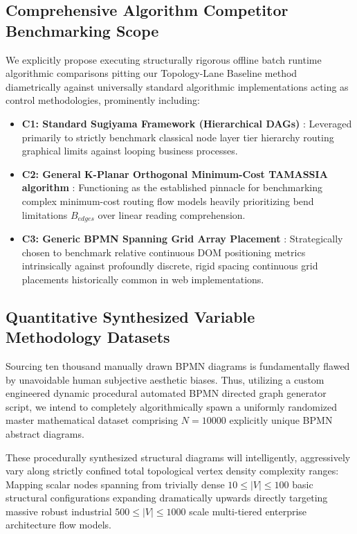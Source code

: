 \documentclass[fleqn,10pt]{wlscirep}
\begin{document}
\subsection*{Comprehensive Algorithm Competitor Benchmarking Scope}
We explicitly propose executing structurally rigorous offline batch runtime algorithmic comparisons pitting our Topology-Lane Baseline method diametrically against universally standard algorithmic implementations acting as control methodologies, prominently including:
\begin{itemize}
    \item \textbf{C1: Standard Sugiyama Framework (Hierarchical DAGs)} \cite{ref_sugiyama}: Leveraged primarily to strictly benchmark classical node layer tier hierarchy routing graphical limits against looping business processes.
    \item \textbf{C2: General K-Planar Orthogonal Minimum-Cost TAMASSIA algorithm} \cite{ref_tamassia}: Functioning as the established pinnacle for benchmarking complex minimum-cost routing flow models heavily prioritizing bend limitations $B_{edges}$ over linear reading comprehension.
    \item \textbf{C3: Generic BPMN Spanning Grid Array Placement} \cite{ref_kitzmann}: Strategically chosen to benchmark relative continuous DOM positioning metrics intrinsically against profoundly discrete, rigid spacing continuous grid placements historically common in web implementations.
\end{itemize}

\subsection*{Quantitative Synthesized Variable Methodology Datasets}
Sourcing ten thousand manually drawn BPMN diagrams is fundamentally flawed by unavoidable human subjective aesthetic biases. Thus, utilizing a custom engineered dynamic procedural automated BPMN directed graph generator script, we intend to completely algorithmically spawn a uniformly randomized master mathematical dataset comprising $N=10000$ explicitly unique BPMN abstract diagrams. 

These procedurally synthesized structural diagrams will intelligently, aggressively vary along strictly confined total topological vertex density complexity ranges: 
Mapping scalar nodes spanning from trivially dense $10 \le |V| \le 100$ basic structural configurations expanding dramatically upwards directly targeting massive robust industrial $500 \le |V| \le 1000$ scale multi-tiered enterprise architecture flow models.
\end{document}

